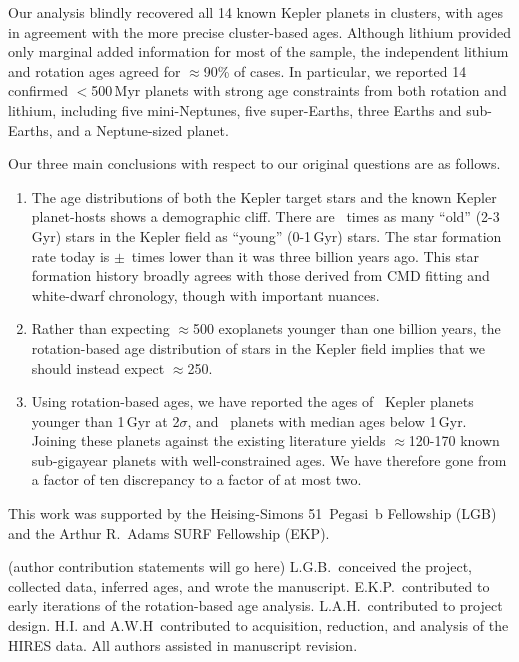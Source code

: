 \documentclass[11pt,twocolumn,tighten]{aastex63}
\begin{document}
Our analysis blindly recovered all 14 known Kepler planets in
clusters, with ages in agreement with the more precise cluster-based
ages.  Although lithium provided only marginal added information for
most of the sample, the independent lithium and rotation ages agreed
for $\approx$90\% of cases.  
In particular, we reported 14 confirmed
$<$500\,Myr planets with strong age constraints from both rotation and
lithium, including five mini-Neptunes, five super-Earths, three Earths
and sub-Earths, and a Neptune-sized planet.

Our three main conclusions with respect to our original questions are
as follows.

\begin{enumerate}[leftmargin=*,topsep=0pt,itemsep=-1ex,partopsep=1ex,parsep=1ex]
  \item The age distributions of both the Kepler target stars and the
    known Kepler planet-hosts shows a demographic cliff.  There are
    \ratioobtoybstars\ times as many ``old'' (2-3\,Gyr) stars in the
    Kepler field as ``young'' (0-1\,Gyr) stars.  The star formation
    rate today is \ratiosfr$\pm$\uncratiosfr\ times lower than it was
    three billion years ago.
    This star formation history broadly agrees with those derived
    from CMD fitting and white-dwarf chronology, though with
    important nuances.
  \item Rather than expecting $\approx$500 exoplanets younger than one
    billion years, the rotation-based age distribution of stars in the
    Kepler field implies that we should instead expect $\approx$250.
  \item Using rotation-based ages, we have reported the ages of
    \nplyounggyrotwosigma\ Kepler planets younger than 1\,Gyr at 2$\sigma$,
    and \nplyounggyro\ planets with median ages below 1\,Gyr.
    Joining these planets against the existing literature yields
    $\approx$120-170 known sub-gigayear planets with well-constrained
    ages.  We have therefore gone from a factor of ten discrepancy to
    a factor of at most two.
\end{enumerate}


\acknowledgements
This work was supported by the Heising-Simons 51~Pegasi~b Fellowship
(LGB)
and the Arthur R.~Adams SURF Fellowship (EKP).

(author contribution statements will go here)
L.G.B.~conceived the project, collected data, 
inferred ages, and wrote the manuscript.
E.K.P.~contributed to early iterations of the rotation-based age analysis.
L.A.H.~contributed to project design.
H.I. and A.W.H~contributed to acquisition, reduction, and analysis of
the HIRES data.
All authors assisted in manuscript revision.
\end{document}
